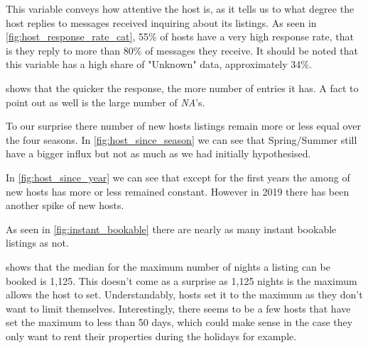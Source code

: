 
This variable conveys how attentive the host is, as it tells us to what degree
the host replies to messages received inquiring about its listings. As seen in
\cref{fig:host_response_rate_cat}, 55\% of hosts have a very high
response rate, that is they reply to more than 80\% of messages they receive.
It should be noted that this variable has a high share of "Unknown"
data, approximately 34\%.



 shows that the quicker the response, the more
number of entries it has. A fact to point out as well is the large number of
\emph{NA}'s.



To our surprise there number of new hosts listings remain more or less equal over
the four seasons. In \cref{fig:host_since_season} we can see that Spring/Summer
still have a bigger influx but not as much as we had initially hypothesised.



In \cref{fig:host_since_year} we can see that except for the first years the
among of new hosts has more or less remained constant. However in 2019 there has
been another spike of new hosts.



As seen in \cref{fig:instant_bookable} there are nearly as many
instant bookable listings as not.



 shows that the median for
the maximum number of nights a listing can be booked is 1,125.
This doesn't come as a surprise as 1,125 nights is the maximum
\airbnb allows the host to set. Understandably, hosts set it to the
maximum as they don't want to limit themselves. Interestingly,
there seems to be a few hosts that have set the maximum to less
than 50 days, which could make sense in the case they only want to
rent their properties during the holidays for example.




